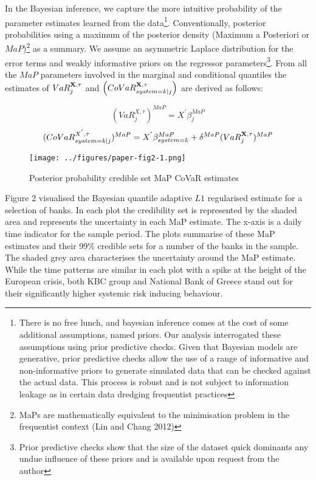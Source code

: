 \documentclass[
  10pt,
]{article}
\begin{document}
In the Bayesian inference, we capture the more intuitive probability of
the parameter estimates learned from the data\footnote{There is no free
  lunch, and bayesian inference comes at the cost of some additional
  assumptions, named priors. Our analysis interrogated these assumptions
  using prior predictive checks. Given that Bayesian models are
  generative, prior predictive checks allow the use of a range of
  informative and non-informative priors to generate simulated data that
  can be checked against the actual data. This process is robust and is
  not subject to information leakage as in certain data dredging
  frequentist practices}. Conventionally, posterior probabilities using
a maximum of the posterior density (Maximum a Posteriori or
\(MaP\))\footnote{MaPs are mathematically equivalent to the minimisation
  problem in the frequentist context (Lin and Chang 2012)} as a summary.
We assume an asymmetric Laplace distribution for the error terms and
weakly informative priors on the regressor parameters\footnote{Prior
  predictive checks show that the size of the dataset quick dominants
  any undue influence of these priors and is available upon request from
  the author}. From all the \(MaP\) parameters involved in the marginal
and conditional quantiles the estimates of \(VaR^{\bf{X},\tau}_j\) and
\(\left( CoVaR_{system=k|j}^{\bf{X},\tau} \right)\) are derived as
follows:

\begin{equation}\label{eq:eq6}
(VaR^{X,\tau}_j)^{MaP} = X^{'}\beta_j^{MaP}
\end{equation} \begin{equation}\label{eq:eq7}
(CoVaR_{system=k|j}^{X^{'},\tau})^{MaP} = X^{'} \beta_{system=k}^{MaP}+\delta^{MaP}(VaR^{\bf{X},\tau}_j)^{MaP}
\end{equation}

\begin{figure}
\centering
\texttt{[image: ../figures/paper-fig2-1.png]}
\caption{Posterior probability credible set MaP CoVaR estimates}
\end{figure}

Figure 2 visualised the Bayesian quantile adaptive \(L1\) regularised
estimate for a selection of banks. In each plot the credibility set is
represented by the shaded area and represents the uncertainty in each
MaP estimate. The x-axis is a daily time indicator for the sample
period. The plots summarise of these MaP estimates and their 99\%
credible sets for a number of the banks in the sample. The shaded grey
area characterises the uncertainty around the MaP estimate. While the
time patterns are similar in each plot with a spike at the height of the
European crisis, both KBC group and National Bank of Greece stand out
for their significantly higher systemic risk inducing behaviour.
\end{document}
